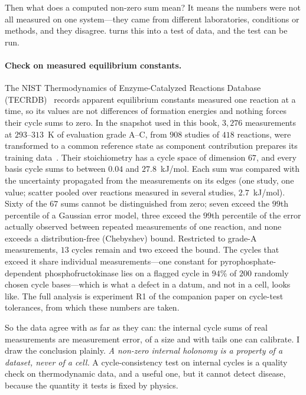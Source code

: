 Then what does a computed non-zero sum mean? It means the numbers were not
all measured on one system---they came from different laboratories,
conditions or methods, and they disagree.  turns this
into a test of data, and the test can be run.

\paragraph{Check on measured equilibrium constants.} \lnkC{} The NIST
Thermodynamics of Enzyme-Catalyzed Reactions Database
(TECRDB)~\citep{goldberg2004} records apparent equilibrium constants measured
one reaction at a time, so its values are not differences of formation
energies and nothing forces their cycle sums to zero. In the snapshot used
in this book, $3{,}276$ measurements at $293$--$313$~K of evaluation grade
A--C, from $908$ studies of $418$ reactions, were transformed to a common
reference state as component contribution prepares its training
data~\citep{beber2022}. Their stoichiometry has a cycle space of dimension
$67$, and every basis cycle sums to between $0.04$ and $27.8$~kJ/mol. Each
sum was compared with the uncertainty propagated from the measurements on
its edges (one study, one value; scatter pooled over reactions measured in
several studies, $2.7$~kJ/mol). Sixty of the $67$ sums cannot be
distinguished from zero; seven exceed the $99$th percentile of a Gaussian
error model, three exceed the $99$th percentile of the error actually
observed between repeated measurements of one reaction, and none exceeds a
distribution-free (Chebyshev) bound. Restricted to grade-A measurements,
$13$ cycles remain and two exceed the bound. The cycles that exceed it share
individual measurements---one constant for pyrophosphate-dependent
phosphofructokinase lies on a flagged cycle in $94\%$ of $200$ randomly
chosen cycle bases---which is what a defect in a datum, and not in a cell,
looks like. The full analysis is experiment R1 of the companion paper on
cycle-test tolerances, from which these numbers are taken.

So the data agree with  as far as they can: the
internal cycle sums of real measurements are measurement error, of a size
and with tails one can calibrate. I draw the conclusion plainly. \emph{A
non-zero internal holonomy is a property of a dataset, never of a cell.} A
cycle-consistency test on internal cycles is a quality check on
thermodynamic data, and a useful one, but it cannot detect disease, because
the quantity it tests is fixed by physics.

